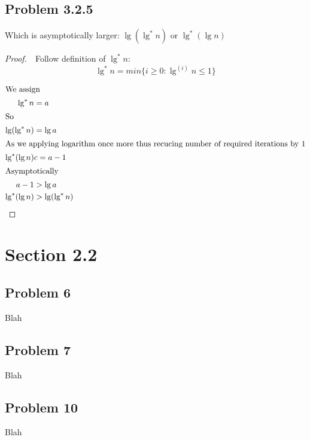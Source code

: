 \documentclass{article}
\begin{document}
\subsection*{Problem 3.2.5}
Which is asymptotically larger: $ \lg(\lg^*n) $ or $ \lg^*(\lg n) $ 
\begin{proof}
    $ $\newline
    $ $\newline
    Follow definition of $ \lg^*n $:
    \begin{equation}
        \lg^*n = min \{i \geq 0: \lg^{(i)} n \leq 1 \}
    \end{equation}
    
    \begin{align*}
        \intertext{We assign} \lg^*n & = a \\
        \intertext{So} \lg(\lg^* n) & = \lg a \\
        \intertext{As we applying logarithm once more thus recucing number of required iterations by 1} \lg^*(\lg n) &c = a - 1 \\
        \intertext{Asymptotically} a - 1 & > \lg a \\
        \lg^*(\lg n) & > \lg(\lg^* n) \\
    \end{align*}
\end{proof}

\section*{Section 2.2}
%
\subsection*{Problem 6}
Blah
\subsection*{Problem 7}
Blah
\subsection*{Problem 10}
Blah
\end{document}
